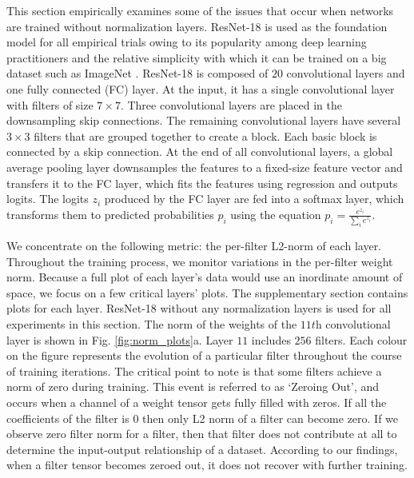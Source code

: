 \documentclass[times,sort&compress]{elsarticle}
\begin{document}
This section empirically examines some of the issues that occur when networks are
trained without normalization layers. ResNet-18 \cite{he2016deep} is used as the
foundation model for all empirical trials owing to its popularity among deep learning
practitioners and the relative simplicity with which it can be trained on a big dataset
such as ImageNet \cite{russakovsky2015imagenet}. ResNet-18 is composed of $20$
convolutional layers and one fully connected (FC) layer. At the input, it has a single
convolutional layer with filters of size $7\times 7$. Three convolutional layers are
placed in the downsampling skip connections. The remaining convolutional layers have
several $3\times 3$ filters that are grouped together to create a block. Each basic
block is connected by a skip connection. At the end of all convolutional layers, a
global average pooling layer downsamples the features to a fixed-size feature vector and
transfers it to the FC layer, which fits the features using regression and outputs
logits. The logits $z_i$ produced by the FC layer are fed into a softmax layer, which
transforms them to predicted probabilities $p_i$ using the equation $p_i=\frac
{e^{z_i}}{\sum _i e^{z_i}}$.

We concentrate on the following metric: the per-filter L2-norm of each layer. Throughout
the training process, we monitor variations in the per-filter weight norm. Because a
full plot of each layer's data would use an inordinate amount of space, we focus on a
few critical layers' plots. The supplementary section contains plots for each layer.
ResNet-18 without any normalization layers is used for all experiments in this section.
The norm of the weights of the $11\textit{th}$ convolutional layer is shown in Fig.
\ref{fig:norm_plots}a. Layer $11$ includes $256$ filters. Each colour on the figure
represents the evolution of a particular filter throughout the course of training
iterations. The critical point to note is that some filters achieve a norm of zero
during training. This event is referred to as `Zeroing Out', and occurs when a channel
of a weight tensor gets fully filled with zeros. If all the coefficients of the filter
is 0 then only L2 norm of a filter can become zero. If we observe zero filter norm for a
filter, then that filter does not contribute at all to determine the input-output
relationship of a dataset. According to our findings, when a filter tensor becomes
zeroed out, it does not recover with further training.
\end{document}

